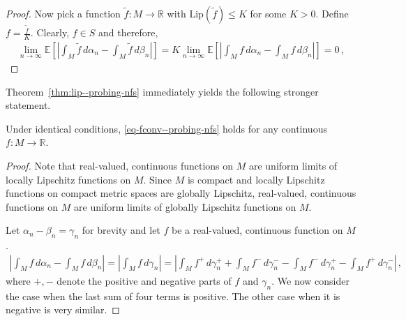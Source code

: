 \begin{thm}
\begin{proof}
Now pick a function $\tilde{f}: M\to\mathbb R$ with $\text{Lip} (\tilde f)\le K$ for some $K>0$. Define $f=\frac{\tilde{f}}{K}$. Clearly, $f\in S$ and therefore,
\begin{align}
    \lim_{n\to\infty}\mathbb E\left[\left|\int_M \tilde f\,d\alpha_n -\int_M \tilde f\,d\beta_n\right|\right] =K\lim_{n\to\infty}\mathbb E\left[\left|\int_M f\,d\alpha_n -\int_M f\,d\beta_n\right|\right] =0 \,, 
\end{align}\label{thm:lip--probing-nfs}
\end{proof}
\end{thm}

Theorem~\ref{thm:lip--probing-nfs} immediately yields the following stronger statement.
\begin{cor}Under identical conditions, \eqref{eq-fconv--probing-nfs} holds for any continuous $f:M\to\mathbb R$.

\begin{proof}

Note that real-valued, continuous functions on $M$ are uniform limits of locally Lipschitz functions on $M$. Since $M$ is compact and locally Lipschitz functions on compact metric spaces are globally Lipschitz, real-valued, continuous  functions on $M$ are uniform limits of globally Lipschitz functions on $M$. 

Let $\alpha_n - \beta_n=\gamma_n$ for brevity and let $f$ be a real-valued, continuous function on $M$.
\begin{align}
    \left|\int_M f\,d\alpha_n - \int_M f\, d\beta_n\right| = \left|\int_M f\,d\gamma_n\right| = \left|\int_M f^+\,d\gamma_n^+ + \int_M f^-\,d\gamma_n^- - \int_M f^-\,d\gamma_n^+ - \int_M f^+\,d\gamma_n^-\right| \,,
\end{align}
where $+, -$ denote the positive and negative parts of $f$ and $\gamma_n$. We now consider the case when the last sum of four terms is positive. The other case when it is negative is very similar.


\end{proof}
\end{cor}
